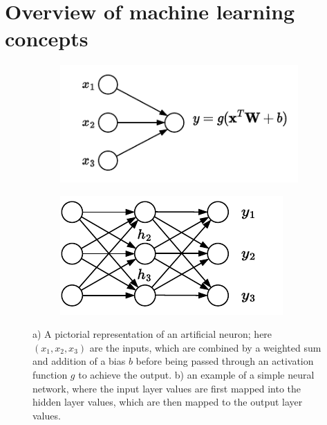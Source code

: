 \documentclass[../main.tex]{subfiles}
\begin{document}
\section{Overview of machine learning concepts}
\label{sec:ml_intro}

\begin{figure}[ht]
     \centering
     \begin{subfigure}[h]{0.40\textwidth}
         \includegraphics[width=\textwidth]{images/neural_network_node.drawio.pdf}
         \caption{}
         \centering
     \end{subfigure}
     \hfill
     \begin{subfigure}[h]{0.5\textwidth}
         \includegraphics[width=\textwidth]{images/single_layer_nn.drawio.pdf}
         \caption{}
        \centering
    \end{subfigure}
     \centering
     \caption{a) A pictorial representation of an artificial neuron; here $(x_1, x_2, x_3)$ are the inputs, which are combined by a weighted sum and addition of a bias $b$ before being passed through an activation function $g$ to achieve the output. b) an example of a simple neural network, where the input layer values are first mapped into the hidden layer values, which are then mapped to the output layer values.}
     \label{fig:nn}
\end{figure}
\end{document}
